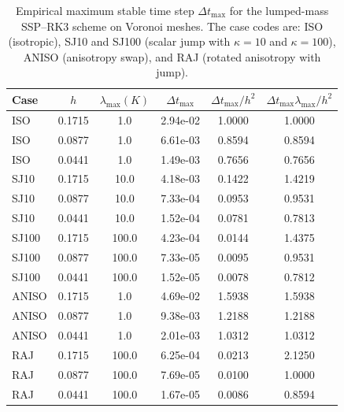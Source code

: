 \documentclass{article}
\begin{document}
\begin{table}[htbp]
    \centering
    \caption{Empirical maximum stable time step $\Delta t_{\max}$ for the lumped-mass SSP--RK3 scheme on Voronoi meshes. The case codes are: ISO (isotropic), SJ10 and SJ100 (scalar jump with $\kappa=10$ and $\kappa=100$), ANISO (anisotropy swap), and RAJ (rotated anisotropy with jump).}
    \label{tab:stability_voronoi}
    \begin{tabular}{l c c c c c}
    \toprule
    Case & $h$ & $\lambda_{\max}(K)$ & $\Delta t_{\max}$ & $\Delta t_{\max}/h^2$ & $\Delta t_{\max}\lambda_{\max}/h^2$ \\
    \midrule
    ISO   & 0.1715 & 1.0   & 2.94e-02 & 1.0000 & 1.0000 \\
    ISO   & 0.0877 & 1.0   & 6.61e-03 & 0.8594 & 0.8594 \\
    ISO   & 0.0441 & 1.0   & 1.49e-03 & 0.7656 & 0.7656 \\
    \addlinespace

    SJ10  & 0.1715 & 10.0  & 4.18e-03 & 0.1422 & 1.4219 \\
    SJ10  & 0.0877 & 10.0  & 7.33e-04 & 0.0953 & 0.9531 \\
    SJ10  & 0.0441 & 10.0  & 1.52e-04 & 0.0781 & 0.7813 \\
    \addlinespace

    SJ100 & 0.1715 & 100.0 & 4.23e-04 & 0.0144 & 1.4375 \\
    SJ100 & 0.0877 & 100.0 & 7.33e-05 & 0.0095 & 0.9531 \\
    SJ100 & 0.0441 & 100.0 & 1.52e-05 & 0.0078 & 0.7812 \\
    \addlinespace

    ANISO & 0.1715 & 1.0   & 4.69e-02 & 1.5938 & 1.5938 \\
    ANISO & 0.0877 & 1.0   & 9.38e-03 & 1.2188 & 1.2188 \\
    ANISO & 0.0441 & 1.0   & 2.01e-03 & 1.0312 & 1.0312 \\
    \addlinespace

    RAJ   & 0.1715 & 100.0 & 6.25e-04 & 0.0213 & 2.1250 \\
    RAJ   & 0.0877 & 100.0 & 7.69e-05 & 0.0100 & 1.0000 \\
    RAJ   & 0.0441 & 100.0 & 1.67e-05 & 0.0086 & 0.8594 \\
    \bottomrule
    \end{tabular}
\end{table}
\end{document}
